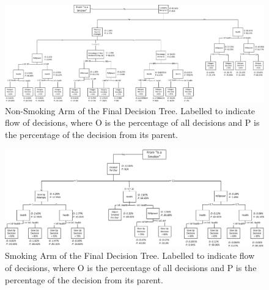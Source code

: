 \documentclass[]{report}
\begin{document}
\begin{landscape}
\begin{figure}
\begin{center}
\includegraphics[width=\paperwidth,keepaspectratio]{dectree-right-labelled.png}
\caption{Non-Smoking Arm of the Final Decision Tree. Labelled to indicate flow of decisions, where O is the percentage of all decisions and P is the percentage of the decision from its parent.}
\end{center}
\label{img:dectree-right-lab}
\end{figure}
\end{landscape}

\begin{landscape}
\begin{figure}
\begin{center}
\includegraphics[width=\paperwidth,keepaspectratio]{dectree-left-label.png}
\caption{Smoking Arm of the Final Decision Tree. Labelled to indicate flow of decisions, where O is the percentage of all decisions and P is the percentage of the decision from its parent.}
\end{center}
\label{img:dectree-left-lab}
\end{figure}
\end{landscape}
\end{document}
